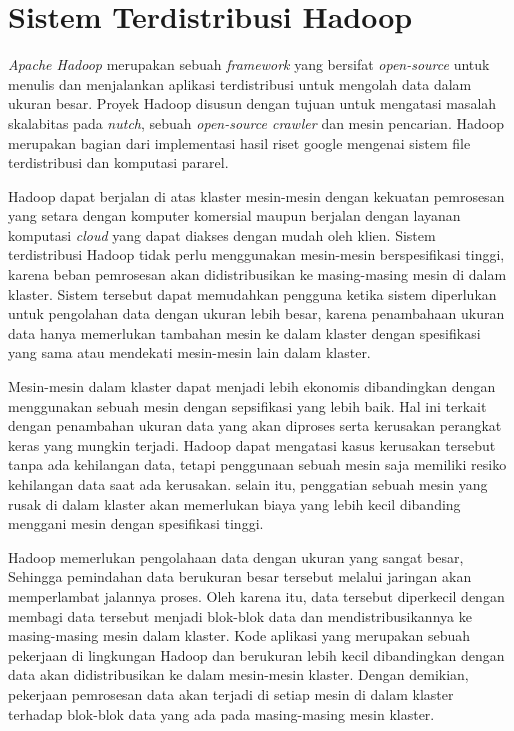 \label{sec:Big Data Stream}

\section{Sistem Terdistribusi Hadoop}
\textit{Apache Hadoop} merupakan sebuah \textit{framework} yang bersifat \textit{open-source} untuk menulis dan menjalankan aplikasi terdistribusi untuk mengolah data dalam ukuran besar. Proyek Hadoop disusun dengan tujuan untuk mengatasi masalah skalabitas pada \textit{nutch}, sebuah \textit{open-source crawler} dan mesin pencarian. Hadoop merupakan bagian dari implementasi hasil riset google mengenai sistem file terdistribusi dan komputasi pararel.

Hadoop dapat berjalan di atas klaster mesin-mesin dengan kekuatan pemrosesan yang setara dengan komputer komersial maupun berjalan dengan layanan komputasi \textit{cloud}  yang dapat diakses dengan mudah oleh klien. Sistem terdistribusi Hadoop tidak perlu menggunakan mesin-mesin berspesifikasi tinggi, karena beban pemrosesan akan didistribusikan ke masing-masing mesin di dalam klaster. Sistem tersebut dapat memudahkan pengguna ketika sistem diperlukan untuk pengolahan data dengan ukuran lebih besar, karena penambahaan ukuran data hanya memerlukan tambahan mesin ke dalam klaster dengan spesifikasi yang sama atau mendekati mesin-mesin lain dalam klaster.

Mesin-mesin dalam klaster dapat menjadi lebih ekonomis dibandingkan dengan menggunakan sebuah mesin dengan sepsifikasi yang lebih baik. Hal ini terkait dengan penambahan ukuran data yang akan diproses serta kerusakan perangkat keras yang mungkin terjadi. Hadoop dapat mengatasi kasus kerusakan tersebut tanpa ada kehilangan data, tetapi penggunaan sebuah mesin saja memiliki resiko kehilangan data saat ada kerusakan. selain itu, penggatian sebuah mesin yang rusak di dalam klaster akan memerlukan biaya yang lebih kecil dibanding menggani mesin dengan spesifikasi tinggi.

Hadoop memerlukan pengolahaan data dengan ukuran yang sangat besar, Sehingga pemindahan data berukuran besar tersebut melalui jaringan akan memperlambat jalannya proses. Oleh karena itu, data tersebut diperkecil dengan membagi data tersebut menjadi blok-blok data dan mendistribusikannya ke masing-masing mesin dalam klaster. Kode aplikasi yang merupakan sebuah pekerjaan di lingkungan Hadoop dan berukuran lebih kecil dibandingkan dengan data akan didistribusikan ke dalam mesin-mesin klaster. Dengan demikian, pekerjaan pemrosesan data akan terjadi di setiap mesin di dalam klaster terhadap blok-blok data yang ada pada masing-masing mesin klaster.

